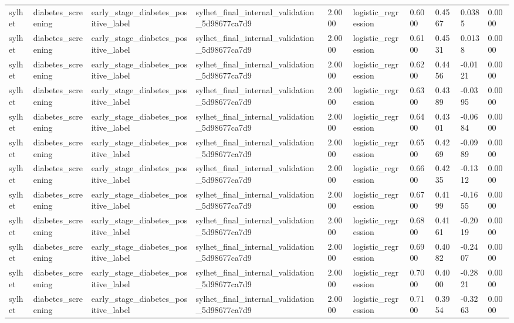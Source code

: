 \begin{tabular}{llllllllll}
sylhet & diabetes\_screening & early\_stage\_diabetes\_positive\_label & sylhet\_final\_internal\_validation\_5d98677ca7d9 & 2.0000 & logistic\_regression & 0.6000 & 0.4567 & 0.0385 & 0.0000 \\
sylhet & diabetes\_screening & early\_stage\_diabetes\_positive\_label & sylhet\_final\_internal\_validation\_5d98677ca7d9 & 2.0000 & logistic\_regression & 0.6100 & 0.4531 & 0.0138 & 0.0000 \\
sylhet & diabetes\_screening & early\_stage\_diabetes\_positive\_label & sylhet\_final\_internal\_validation\_5d98677ca7d9 & 2.0000 & logistic\_regression & 0.6200 & 0.4456 & -0.0121 & 0.0000 \\
sylhet & diabetes\_screening & early\_stage\_diabetes\_positive\_label & sylhet\_final\_internal\_validation\_5d98677ca7d9 & 2.0000 & logistic\_regression & 0.6300 & 0.4389 & -0.0395 & 0.0000 \\
sylhet & diabetes\_screening & early\_stage\_diabetes\_positive\_label & sylhet\_final\_internal\_validation\_5d98677ca7d9 & 2.0000 & logistic\_regression & 0.6400 & 0.4301 & -0.0684 & 0.0000 \\
sylhet & diabetes\_screening & early\_stage\_diabetes\_positive\_label & sylhet\_final\_internal\_validation\_5d98677ca7d9 & 2.0000 & logistic\_regression & 0.6500 & 0.4269 & -0.0989 & 0.0000 \\
sylhet & diabetes\_screening & early\_stage\_diabetes\_positive\_label & sylhet\_final\_internal\_validation\_5d98677ca7d9 & 2.0000 & logistic\_regression & 0.6600 & 0.4235 & -0.1312 & 0.0000 \\
sylhet & diabetes\_screening & early\_stage\_diabetes\_positive\_label & sylhet\_final\_internal\_validation\_5d98677ca7d9 & 2.0000 & logistic\_regression & 0.6700 & 0.4199 & -0.1655 & 0.0000 \\
sylhet & diabetes\_screening & early\_stage\_diabetes\_positive\_label & sylhet\_final\_internal\_validation\_5d98677ca7d9 & 2.0000 & logistic\_regression & 0.6800 & 0.4161 & -0.2019 & 0.0000 \\
sylhet & diabetes\_screening & early\_stage\_diabetes\_positive\_label & sylhet\_final\_internal\_validation\_5d98677ca7d9 & 2.0000 & logistic\_regression & 0.6900 & 0.4082 & -0.2407 & 0.0000 \\
sylhet & diabetes\_screening & early\_stage\_diabetes\_positive\_label & sylhet\_final\_internal\_validation\_5d98677ca7d9 & 2.0000 & logistic\_regression & 0.7000 & 0.4000 & -0.2821 & 0.0000 \\
sylhet & diabetes\_screening & early\_stage\_diabetes\_positive\_label & sylhet\_final\_internal\_validation\_5d98677ca7d9 & 2.0000 & logistic\_regression & 0.7100 & 0.3954 & -0.3263 & 0.0000 \\

\end{tabular}
